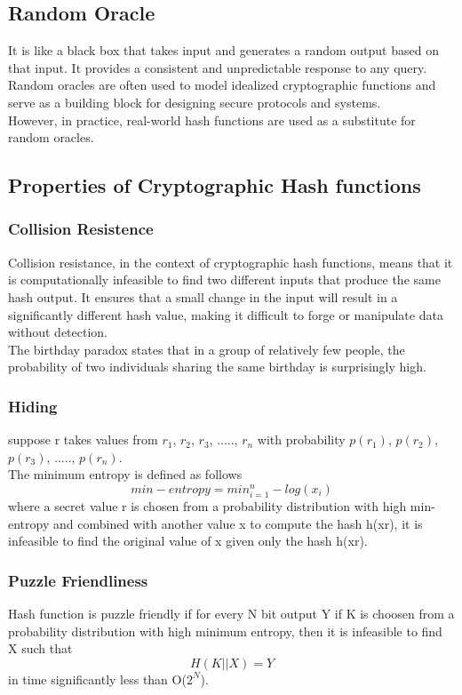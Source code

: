 \documentclass{report}
\begin{document}
\subsection{Random Oracle}
It is like a black box that takes input and generates a random output based on that input. It provides a consistent and unpredictable response to any query. Random oracles are often used to model idealized cryptographic functions and serve as a building block for designing secure protocols and systems. \\
However, in practice, real-world hash functions are used as a substitute for random oracles.
\subsection{Properties of Cryptographic Hash functions}
\subsubsection{Collision Resistence}
Collision resistance, in the context of cryptographic hash functions, means that it is computationally infeasible to find two different inputs that produce the same hash output. It ensures that a small change in the input will result in a significantly different hash value, making it difficult to forge or manipulate data without detection. \\
The birthday paradox states that in a group of relatively few people, the probability of two individuals sharing the same birthday is surprisingly high.
\subsubsection{Hiding}
suppose r takes values from $r_1$, $r_2$, $r_3$, ....., $r_n$ with probability  $p(r_1)$, $p(r_2)$, $p(r_3)$, ....., $p(r_n)$. \\
The minimum entropy is defined as follows 
$$min-entropy = min_{i=1}^{n} -log(x_i)$$
where a secret value r is chosen from a probability distribution with high min-entropy and combined with another value x to compute the hash h(x\textbar\textbar r), it is infeasible to find the original value of x given only the hash h(x\textbar\textbar r). \\
\subsubsection{Puzzle Friendliness}
Hash function is puzzle friendly if for every N bit output Y if K is choosen from a probability distribution with high minimum entropy, then it is infeasible to find X such that 
$$H(K||X) = Y$$
in time significantly less than O($2^N$).
\end{document}
